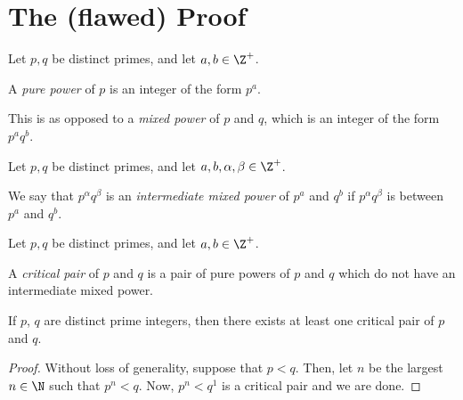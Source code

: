 \documentclass[a5paper]{article}
\begin{document}
\section{The (flawed) Proof}

\begin{definition*}Let $p,q$ be distinct primes, and let $a,b \in \Z^+$. 

A \emph{pure power} of $p$ is an integer of the form $p^a$. 

This is as opposed to a \emph{mixed power} of $p$ and $q$, which is an integer of the form $p^a q^b$.
\end{definition*}

\begin{definition*}Let $p,q$ be distinct primes, and let $a,b,\alpha,\beta \in \Z^+$. 

We say that $p^\alpha q^\beta$ is an \emph{intermediate mixed power} of $p^a$ and $q^b$ if $p^\alpha q^\beta$ is between $p^a$ and $q^b$. 
\end{definition*}

\begin{definition*}Let $p,q$ be distinct primes, and let $a,b \in \Z^+$. 

A \emph{critical pair} of $p$ and $q$ is a pair of pure powers of $p$ and $q$ which do not have an intermediate mixed power. 
\end{definition*}

\begin{lemma}\label{thelemma}
If $p$, $q$ are distinct prime integers, then there exists at least one critical pair of $p$ and $q$. 

\begin{proof}
Without loss of generality, suppose that $p<q$. Then, let $n$ be the largest $n\in\N$ such that $p^n<q$. Now, $p^n<q^1$ is a critical pair and we are done.
\end{proof}
\end{lemma}
\end{document}
